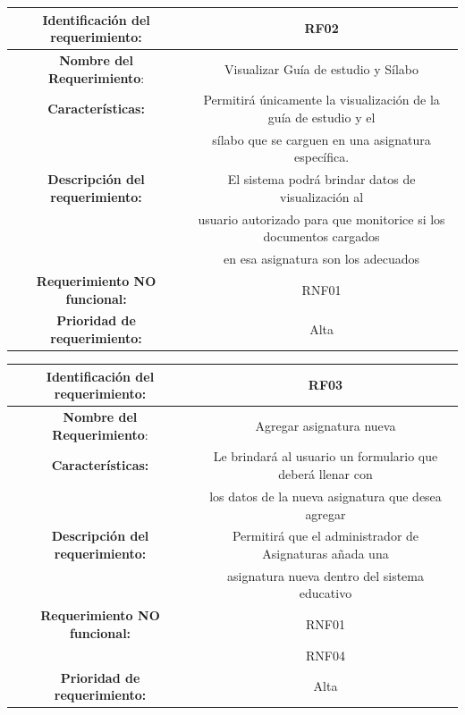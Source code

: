 \documentclass[11pt]{article}
\begin{document}
\begin{tabular}{|c|c|} 
\hline
\textbf{Identificación del requerimiento:} & RF02  \\
\hline
\textbf{Nombre del Requerimiento}: &Visualizar Guía de estudio y 
Sílabo \\
\hline
\textbf{Características:} & Permitirá únicamente la visualización de
la guía de  estudio y el\\ & sílabo que  se carguen en una 
asignatura específica.  \\
\hline
\textbf{Descripción del requerimiento:} & El sistema podrá brindar 
datos de visualización al \\ & usuario autorizado para que 
monitorice si los documentos cargados \\ & en esa asignatura son los 
adecuados \\
\hline
\textbf{Requerimiento NO funcional:} & RNF01 \\
\hline
\textbf{Prioridad de requerimiento:} & Alta \\
\hline

\end{tabular}


\vspace{15pt}

\begin{tabular}{|c|c|} 
\hline
\textbf{Identificación del requerimiento:} & RF03  \\
\hline
\textbf{Nombre del Requerimiento}: & Agregar asignatura nueva \\
\hline
\textbf{Características:} & Le brindará al usuario un formulario que
deberá llenar  con \\ & los datos de la nueva asignatura que desea 
agregar  \\
\hline
\textbf{Descripción del requerimiento:} & Permitirá que el 
administrador de Asignaturas añada  una\\ & asignatura  nueva dentro
del sistema educativo \\
\hline
\textbf{Requerimiento NO funcional:} & RNF01 \\
& RNF04  \\
\hline
\textbf{Prioridad de requerimiento:} & Alta \\
\hline

\end{tabular}


\vspace{15pt}
\end{document}
